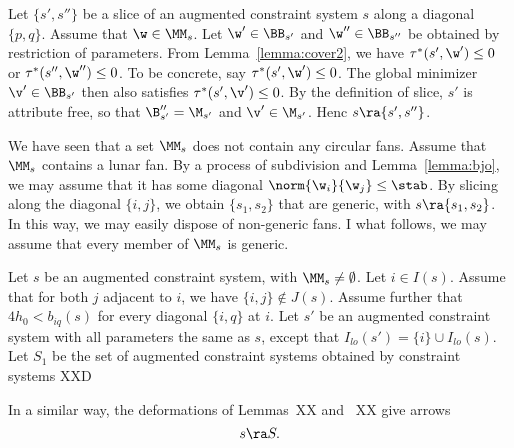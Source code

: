 \begin{example}[slice]  Let $\{s',s''\}$ be a slice of
an augmented constraint system $s$ along
a diagonal $\{p,q\}$.  Assume that $\w\in\MM_s$.
Let $\w'\in \BB_{s'}$ and $\w''\in \BB_{s''}$ be obtained
by restriction of parameters.  From Lemma~\ref{lemma:cover2},
we have $\tau^*(s',\w')\le 0$ or $\tau^*(s'',\w'')\le0$.  To be
concrete, say $\tau^*(s',\w')\le 0$.  The global minimizer
$\v'\in\BB_{s'}$
then also satisfies $\tau^*(s',\v')\le 0$.  By the definition of
slice, $s'$ is attribute free, so that $\B''_{s'}=\M_{s'}$ and
$\v'\in \M_{s'}$.  Henc $s\ra\{s',s''\}$.
\end{example}

\begin{remark}
We have seen that a set $\MM_s$ does not contain any circular fans.
Assume that $\MM_s$ contains a lunar fan.
By a process of subdivision and Lemma~\ref{lemma:bjo}, we may assume
that it has some diagonal $\norm{\w_i}{\w_j}\le\stab$.  By slicing
along
the diagonal $\{i,j\}$, we obtain $\{s_1,s_2\}$ that are generic, with
$s\ra\{s_1,s_2\}$.  In this way, we may easily dispose of non-generic
fans.  I what follows, we may assume that every member of $\MM_s$ is
generic.
\end{remark}

\begin{example}[deformation]  Let $s$ be an augmented constraint
  system, with $\MM_s\ne\emptyset$.  Let $i\in I(s)$.
Assume that for both $j$ adjacent to $i$, we have $\{i,j\}\not\in
J(s)$.
Assume further that $4h_0 < b_{iq}(s)$ for every diagonal $\{i,q\}$ at
$i$.  Let $s'$ be an augmented constraint system with all parameters
the same as $s$, except that $I_{lo}(s') = \{i\}\cup I_{lo}(s)$.
Let $S_1$ be the set of augmented constraint systems obtained by
constraint systems XXD
\end{example}



In a similar way, the deformations of Lemmas~XX and ~XX give arrows
\[
s\ra S.
\]




